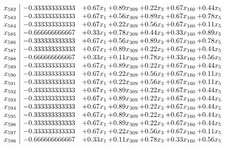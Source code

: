 \documentclass[8pt]{article}
\begin{document}
\[\begin{array}{c| c c@{\hskip 2pt} c@{\hskip 2pt} c@{\hskip 2pt} c@{\hskip 2pt} c@{\hskip 2pt} }
 x_{582}   &  -0.333333333333 & +  0.67 x_{1} & +  0.89 x_{309} & +  0.22 x_{3} & +  0.67 x_{160} & +  0.44 x_{5}\\
 x_{583}   &  -0.333333333333 & +  0.67 x_{1} & +  0.56 x_{309} & +  0.89 x_{3} & +  0.67 x_{160} & +  0.78 x_{5}\\
 x_{584}   &  -0.333333333333 & +  0.67 x_{1} & +  0.22 x_{309} & +  0.56 x_{3} & +  0.67 x_{160} & +  0.11 x_{5}\\
 x_{585}   &  -0.666666666667 & +  0.33 x_{1} & +  0.78 x_{309} & +  0.44 x_{3} & +  0.33 x_{160} & +  0.89 x_{5}\\
 x_{586}   &  -0.333333333333 & +  0.67 x_{1} & +  0.56 x_{309} & +  0.89 x_{3} & +  0.67 x_{160} & +  0.78 x_{5}\\
 x_{587}   &  -0.333333333333 & +  0.67 x_{1} & +  0.89 x_{309} & +  0.22 x_{3} & +  0.67 x_{160} & +  0.44 x_{5}\\
 x_{588}   &  -0.666666666667 & +  0.33 x_{1} & +  0.11 x_{309} & +  0.78 x_{3} & +  0.33 x_{160} & +  0.56 x_{5}\\
 x_{589}   &  -0.333333333333 & +  0.67 x_{1} & +  0.89 x_{309} & +  0.22 x_{3} & +  0.67 x_{160} & +  0.44 x_{5}\\
 x_{590}   &  -0.333333333333 & +  0.67 x_{1} & +  0.22 x_{309} & +  0.56 x_{3} & +  0.67 x_{160} & +  0.11 x_{5}\\
 x_{591}   &  -0.333333333333 & +  0.67 x_{1} & +  0.22 x_{309} & +  0.56 x_{3} & +  0.67 x_{160} & +  0.11 x_{5}\\
 x_{592}   &  -0.333333333333 & +  0.67 x_{1} & +  0.89 x_{309} & +  0.22 x_{3} & +  0.67 x_{160} & +  0.44 x_{5}\\
 x_{593}   &  -0.333333333333 & +  0.67 x_{1} & +  0.89 x_{309} & +  0.22 x_{3} & +  0.67 x_{160} & +  0.44 x_{5}\\
 x_{594}   &  -0.333333333333 & +  0.67 x_{1} & +  0.89 x_{309} & +  0.22 x_{3} & +  0.67 x_{160} & +  0.44 x_{5}\\
 x_{595}   &  -0.333333333333 & +  0.67 x_{1} & +  0.89 x_{309} & +  0.22 x_{3} & +  0.67 x_{160} & +  0.44 x_{5}\\
 x_{596}   &  -0.333333333333 & +  0.67 x_{1} & +  0.89 x_{309} & +  0.22 x_{3} & +  0.67 x_{160} & +  0.44 x_{5}\\
 x_{597}   &  -0.333333333333 & +  0.67 x_{1} & +  0.22 x_{309} & +  0.56 x_{3} & +  0.67 x_{160} & +  0.11 x_{5}\\
 x_{598}   &  -0.666666666667 & +  0.33 x_{1} & +  0.11 x_{309} & +  0.78 x_{3} & +  0.33 x_{160} & +  0.56 x_{5}\\

\end{array}\]
\end{document}
